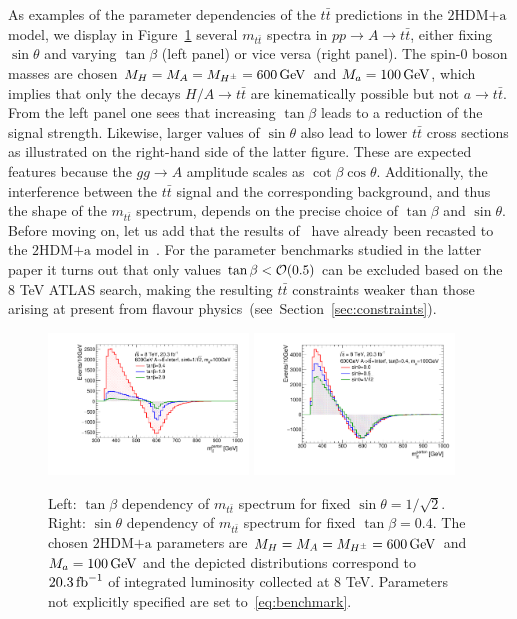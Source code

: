 \documentclass[a4paper, 11pt,notoc]{article}
\newcommand{\mA}{\ensuremath{M_{A}}\xspace}
\newcommand{\ma}{\ensuremath{M_{a}}\xspace}
\newcommand{\mH}{\ensuremath{M_{H}}\xspace}
\newcommand{\mHc}{\ensuremath{M_{H^{\pm}}}\xspace}
\newcommand{\hdma}{\ensuremath{\textrm{2HDM+a}}\xspace}
\begin{document}
As examples of the parameter dependencies of the $t \bar t$ predictions in the \hdma model, we display in  Figure~\ref{fig:ttres_2HDM_A} several $m_{t \bar t}$ spectra in $pp \to A \to t \bar t$, either fixing $\sin \theta$ and varying $\tan \beta$ (left panel) or vice versa (right panel). The  spin-0 boson  masses are chosen $\mH=\mA=\mHc =600 \, {\rm GeV}$ and $\ma=100 \, {\rm GeV}$, which implies that only the  decays $H/A \to t \bar t$  are kinematically possible but not $a \to t \bar t$.  From the left panel one sees that increasing $\tan \beta$ leads  to a reduction of the signal strength.  Likewise, larger values of $\sin \theta$ also lead to lower $t \bar t$ cross sections as illustrated on the right-hand side of the latter figure. These are expected features because the $g g \to A$ amplitude  scales as $\cot \beta \cos \theta$.  Additionally, the interference between the $t \bar t$ signal and the corresponding background, and thus the shape of the $m_{t \bar t}$ spectrum, depends on the precise choice of $\tan \beta$  and $\sin \theta$.  Before moving on, let us add that the results of~\cite{Aaboud:2017hnm} have already been recasted to the \hdma model in~\cite{Bauer:2017ota}. For the parameter benchmarks studied in the latter paper it turns out that only values $\tan \beta < {\cal O} ( 0.5)$ can be excluded based on the 8 TeV ATLAS search, making the resulting $t \bar t$ constraints weaker than those arising at present from flavour physics~(see~Section~\ref{sec:constraints}). 

\begin{figure}
\centering
\includegraphics[width=0.475\textwidth]{ttres_2HDMa_A_tanb.pdf} \quad 
\includegraphics[width=0.475\textwidth]{ttres_2HDMa_A_sinp.pdf}
\vspace{4mm}
\caption{Left: $\tan \beta$ dependency of $m_{t \bar t}$ spectrum for fixed $\sin \theta = 1/\sqrt{2}$. Right:  $\sin \theta$ dependency of $m_{t \bar t}$ spectrum for fixed $\tan \beta = 0.4$. The chosen \hdma parameters are $\mH=\mA=\mHc =600 \, {\rm GeV}$ and $\ma=100 \, {\rm GeV}$ and the depicted distributions correspond to $20.3 \, {\rm fb}^{-1}$ of integrated luminosity collected at 8 TeV. Parameters not explicitly specified are set to~\eqref{eq:benchmark}.}
\label{fig:ttres_2HDM_A}
\end{figure}
\end{document}
